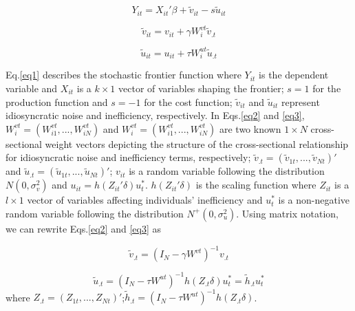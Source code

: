 \begin{equation}\label{eq1}
 Y_{it} = X_{it}'\beta + \tilde{v}_{it}-s\tilde{u}_{it}
\end{equation}

\begin{equation}\label{eq2}
	\tilde{v}_{it} =v_{it}+ \gamma W_{i}^{vt}\tilde{v}_{.t} 
\end{equation}

\begin{equation}\label{eq3}
	\tilde{u}_{it} =u_{it}+ \tau W_{i}^{ut}\tilde{u}_{.t} 
\end{equation}

 Eq.\eqref{eq1}  describes the stochastic frontier function where $Y_{it}$ is the dependent variable and $X_{it}$ is a $k \times 1$ vector of variables shaping the frontier; $s=1$ for the production function and  $s=-1$ for the cost function; $\tilde{v}_{it}$ and $\tilde{u}_{it}$ represent  idiosyncratic noise and inefficiency, respectively. In  Eqs.\eqref{eq2} and \eqref{eq3}, $W_{i}^{vt}=(W_{i1}^{vt},...,W_{iN}^{vt})$ and $W_{i}^{vt}=(W_{i1}^{vt},...,W_{iN}^{vt})$ are two known $1 \times N$ cross-sectional weight vectors  depicting the structure of the  cross-sectional relationship for idiosyncratic noise and inefficiency terms, respectively; $\tilde{v}_{.t}=(\tilde{v}_{1t},...,\tilde{v}_{Nt})' $ and $\tilde{u}_{.t}=(\tilde{u}_{1t},...,\tilde{u}_{Nt})'$; $v_{it}$  is a random variable following the distribution $N(0,\sigma_v^2)$ and $u_{it}=h(Z_{it}'\delta)u_t^*$. $h(Z_{it}'\delta)$ is the scaling function where $Z_{it}$ is a $l \times 1$ vector of variables affecting individuals' inefficiency  and $u_t^*$ is a non-negative random variable following the distribution $N^+(0,\sigma_{u}^2)$.  Using matrix notation, we can rewrite Eqs.\eqref{eq2} and \eqref{eq3} as
 
 \begin{equation}\label{eq2b}
 	\tilde{v}_{.t} =(I_N-\gamma W^{vt})^{-1}v_{.t} 
 \end{equation}
 
 \begin{equation}\label{eq3b}
 		\tilde{u}_{.t} =(I_N-\tau W^{ut})^{-1}h(Z_{.t}\delta)u_t^* = \tilde{h}_{.t}u_t^*
 \end{equation}
 where $Z_{.t}=(Z_{1t},...,Z_{Nt})'$;$\tilde{h}_{.t}=(I_N-\tau W^{ut})^{-1}h(Z_{.t}\delta)$.
 
